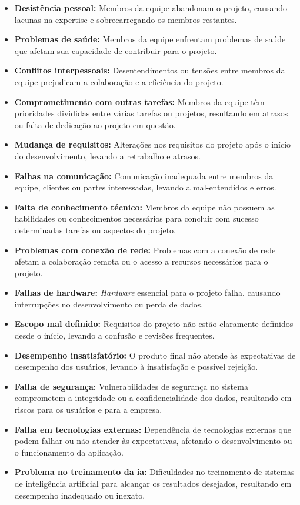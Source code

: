 \begin{itemize}
    \item \textbf{Desistência pessoal:} Membros da equipe abandonam o projeto, causando lacunas na expertise e sobrecarregando os membros restantes.
    \item \textbf{Problemas de saúde:} Membros da equipe enfrentam problemas de saúde que afetam sua capacidade de contribuir para o projeto.
    \item \textbf{Conflitos interpessoais:} Desentendimentos ou tensões entre membros da equipe prejudicam a colaboração e a eficiência do projeto.
    \item \textbf{Comprometimento com outras tarefas:} Membros da equipe têm prioridades divididas entre várias tarefas ou projetos, resultando em atrasos ou falta de dedicação ao projeto em questão.
    \item \textbf{Mudança de requisitos:} Alterações nos requisitos do projeto após o início do desenvolvimento, levando a retrabalho e atrasos.
    \item \textbf{Falhas na comunicação:} Comunicação inadequada entre membros da equipe, clientes ou partes interessadas, levando a mal-entendidos e erros.
    \item \textbf{Falta de conhecimento técnico:} Membros da equipe não possuem as habilidades ou conhecimentos necessários para concluir com sucesso determinadas tarefas ou aspectos do projeto.
    \item \textbf{Problemas com conexão de rede:} Problemas com a conexão de rede afetam a colaboração remota ou o acesso a recursos necessários para o projeto.
    \item \textbf{Falhas de hardware:} \textit{Hardware} essencial para o projeto falha, causando interrupções no desenvolvimento ou perda de dados.
    \item \textbf{Escopo mal definido:} Requisitos do projeto não estão claramente definidos desde o início, levando a confusão e revisões frequentes.
    \item \textbf{Desempenho insatisfatório:} O produto final não atende às expectativas de desempenho dos usuários, levando à insatisfação e possível rejeição.
    \item \textbf{Falha de segurança:} Vulnerabilidades de segurança no sistema comprometem a integridade ou a confidencialidade dos dados, resultando em riscos para os usuários e para a empresa.
    \item \textbf{Falha em tecnologias externas:} Dependência de tecnologias externas que podem falhar ou não atender às expectativas, afetando o desenvolvimento ou o funcionamento da aplicação.
    \item \textbf{Problema no treinamento da \acs{ia}:} Dificuldades no treinamento de sistemas de inteligência artificial para alcançar os resultados desejados, resultando em desempenho inadequado ou inexato.
\end{itemize}

